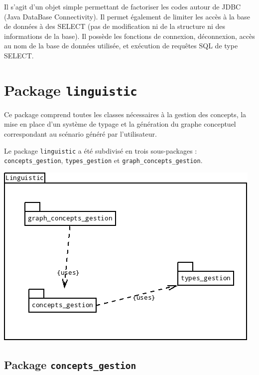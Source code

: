 \documentclass[12pt]{report}
\begin{document}
    Il s'agit d'un objet simple permettant de factoriser les codes autour de JDBC (Java DataBase Connectivity). Il permet également de limiter les accès à la base de données à des SELECT (pas de modification ni de la structure ni des informations de la base).
    Il possède les fonctions de connexion, déconnexion, accès au nom de la base de données utilisée, et exécution de requêtes SQL de type SELECT.


\section{Package \texttt{linguistic}}

Ce package comprend toutes les classes nécessaires à la gestion des concepts, la mise en place d'un système de typage et la génération du graphe conceptuel correspondant au scénario généré par l'utilisateur.

Le package \texttt{linguistic} a été subdivisé en trois sous-packages : \texttt{concepts\_gestion}, \texttt{types\_gestion} et \texttt{graph\_concepts\_gestion}.

\begin{center}
\includegraphics[scale=0.5]{DiagLinguisticPackages.png}
\end{center}

\subsection{Package \texttt{concepts\_gestion}}
\end{document}
